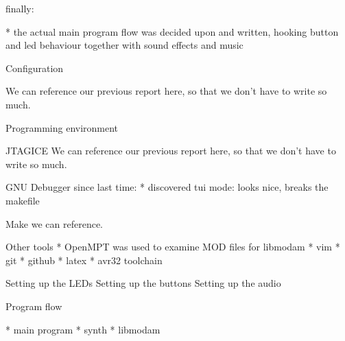 finally:

* the actual main program flow was decided upon and written, hooking button and led behaviour together with sound effects and music



Configuration

We can reference our previous report here, so that we don't have to write so much.


Programming environment

JTAGICE
We can reference our previous report here, so that we don't have to write so much.

GNU Debugger
since last time:
* discovered tui mode: looks nice, breaks the makefile

Make
we can reference.

Other tools
* OpenMPT was used to examine MOD files for libmodam
* vim
* git
* github
* latex
* avr32 toolchain

Setting up the LEDs
Setting up the buttons
Setting up the audio


Program flow

* main program
* synth
* libmodam
